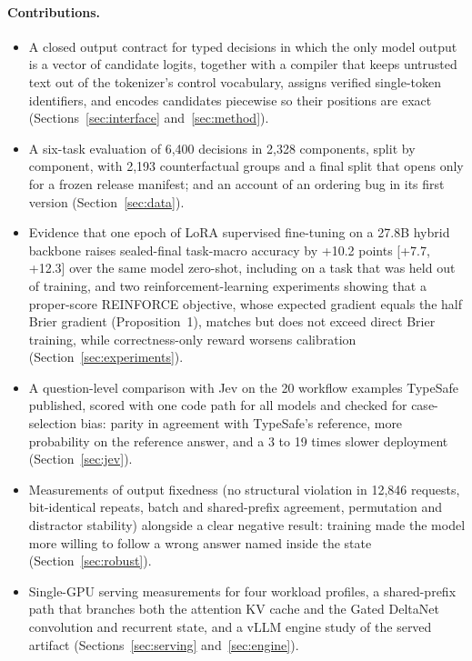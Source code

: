 \paragraph{Contributions.}
\begin{itemize}
  \item A closed output contract for typed decisions in which the only model output is a
    vector of candidate logits, together with a compiler that keeps untrusted text out of
    the tokenizer's control vocabulary, assigns verified single-token identifiers, and
    encodes candidates piecewise so their positions are exact (Sections~\ref{sec:interface}
    and~\ref{sec:method}).
  \item A six-task evaluation of 6,400 decisions in 2,328 components, split by component,
    with 2,193 counterfactual groups and a final split that opens only for a frozen release
    manifest; and an account of an ordering bug in its first version
    (Section~\ref{sec:data}).
  \item Evidence that one epoch of LoRA supervised fine-tuning on a 27.8B hybrid backbone
    raises sealed-final task-macro accuracy by +10.2 points [+7.7, +12.3] over the same
    model zero-shot, including on a task that was held out of training, and two
    reinforcement-learning experiments showing that a proper-score REINFORCE objective,
    whose expected gradient equals the half Brier gradient (Proposition~1), matches but does
    not exceed direct Brier training, while correctness-only reward worsens calibration
    (Section~\ref{sec:experiments}).
  \item A question-level comparison with Jev on the 20 workflow examples TypeSafe published,
    scored with one code path for all models and checked for case-selection bias: parity in
    agreement with TypeSafe's reference, more probability on the reference answer, and a
    3 to 19 times slower deployment (Section~\ref{sec:jev}).
  \item Measurements of output fixedness (no structural violation in 12,846 requests,
    bit-identical repeats, batch and shared-prefix agreement, permutation and distractor
    stability) alongside a clear negative result: training made the model more willing to
    follow a wrong answer named inside the state (Section~\ref{sec:robust}).
  \item Single-GPU serving measurements for four workload profiles, a shared-prefix path that
    branches both the attention KV cache and the Gated DeltaNet convolution and recurrent
    state, and a vLLM engine study of the served artifact (Sections~\ref{sec:serving}
    and~\ref{sec:engine}).
\end{itemize}


